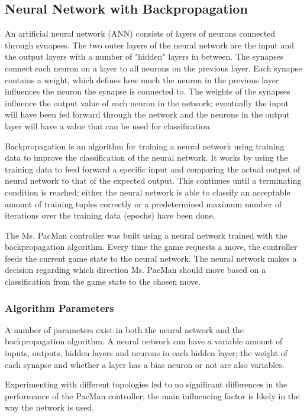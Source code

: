 \subsection{Neural Network with Backpropagation}
\label{A-NN}
An artificial neural network (ANN) consists of layers of neurons connected through synapses. The two outer layers of the neural network are the input and the output layers with a number of "hidden" layers in between. The synapses connect each neuron on a layer to all neurons on the previous layer. Each synapse contains a weight, which defines how much the neuron in the previous layer influences the neuron the synapse is connected to. The weights of the synapses influence the output value of each neuron in the network; eventually the input will have been fed forward through the network and the neurons in the output layer will have a value that can be used for classification\cite{lecture6}.

Backpropagation is an algorithm for training a neural network using training data to improve the classification of the neural network. It works by using the training data to feed forward a specific input and comparing the actual output of neural network to that of the expected output. This continues until a terminating condition is reached; either the neural network is able to classify an acceptable amount of training tuples correctly or a predetermined maximum number of iterations over the training data (epochs) have been done\cite{lecture6, ross1999, Han:2011:DMC:1972541}.

The Ms. PacMan controller was built using a neural network trained with the backpropagation algorithm. Every time the game requests a move, the controller feeds the current game state to the neural network. The neural network makes a decision regarding which direction Ms. PacMan should move based on a classification from the game state to the chosen move.

\subsubsection{Algorithm Parameters}
A number of parameters exist in both the neural network and the backpropagation algorithm. A neural network can have a variable amount of inputs, outputs, hidden layers and neurons in each hidden layer; the weight of each synapse and whether a layer has a bias neuron or not are also variables.

Experimenting with different topologies led to no significant differences in the performance of the PacMan controller; the main influencing factor is likely in the way the network is used.

